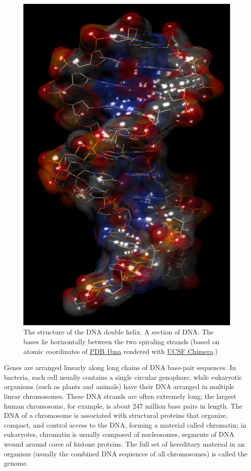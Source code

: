 \begin{figure}

{\centering \includegraphics[width=0.7\linewidth]{./figures/dna/dna_surface_transparent} 

}

\caption{The structure of the DNA double helix. A section of DNA. The bases lie horizontally between the two spiraling strands (based on atomic coordinates of \href{https://www.rcsb.org/structure/1bna}{PDB 1bna} rendered with \href{https://www.cgl.ucsf.edu/chimera/}{UCSF Chimera}.)}\label{fig:dnastruc}
\end{figure}

Genes are arranged linearly along long chains of DNA base-pair sequences. In bacteria, each cell usually contains a single circular genophore, while eukaryotic organisms (such as plants and animals) have their DNA arranged in multiple linear chromosomes. These DNA strands are often extremely long; the largest human chromosome, for example, is about 247 million base pairs in length. The DNA of a chromosome is associated with structural proteins that organize, compact, and control access to the DNA, forming a material called chromatin; in eukaryotes, chromatin is usually composed of nucleosomes, segments of DNA wound around cores of histone proteins. The full set of hereditary material in an organism (usually the combined DNA sequences of all chromosomes) is called the genome.

